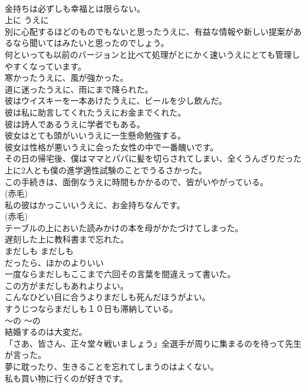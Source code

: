 \documentclass[8pt]{extreport}
\begin{document}
\begin{CJK}{UTF8}{min}
\\	金持ちは必ずしも幸福とは限らない。   
\\	上に	うえに	
\\	別に心配するほどのものでもないと思ったうえに、有益な情報や新しい提案があるなら聞いてはみたいと思ったのでしょう。  
\\	何といっても以前のバージョンと比べて処理がとにかく速いうえにとても管理しやすくなっています。  
\\	寒かったうえに、風が強かった。   
\\	道に迷ったうえに、雨にまで降られた。   
\\	彼はウイスキーを一本あけたうえに、ビールを少し飲んだ。  
\\	彼は私に助言してくれたうえにお金までくれた。   
\\	彼は詩人であるうえに学者でもある。   
\\	彼女はとても頭がいいうえに一生懸命勉強する。   
\\	彼女は性格が悪いうえに会った女性の中で一番醜いです。  
\\	その日の帰宅後、僕はママとパパに髪を切らされてしまい、全くうんざりだった上に2人とも僕の進学適性試験のことでうるさかった。  
\\	この手続きは、面倒なうえに時間もかかるので、皆がいやがっている。  
\\	(赤毛)
\\	私の彼はかっこいいうえに、お金持ちなんです。  
\\	(赤毛)
\\	テーブルの上においた読みかけの本を母がかたづけてしまった。  
\\	遅刻した上に教科書まで忘れた。   
\\	まだしも	まだしも	
\\	だったら、ほかのよりいい	
\\	一度ならまだしもここまで六回その言葉を間違えって書いた。  
\\	この方がまだしもあれよりよい。   
\\	こんなひどい目に合うよりまだしも死んだほうがよい。   
\\	すうじつならまだしも１０日も滞納している。   
\\	〜の	〜の	
\\	結婚するのは大変だ。  
\\	「さあ、皆さん、正々堂々戦いましょう」全選手が周りに集まるのを待って先生が言った。  
\\	夢に耽ったり、生きることを忘れてしまうのはよくない。   
\\	私も買い物に行くのが好きです。  

\end{CJK}
\end{document}
